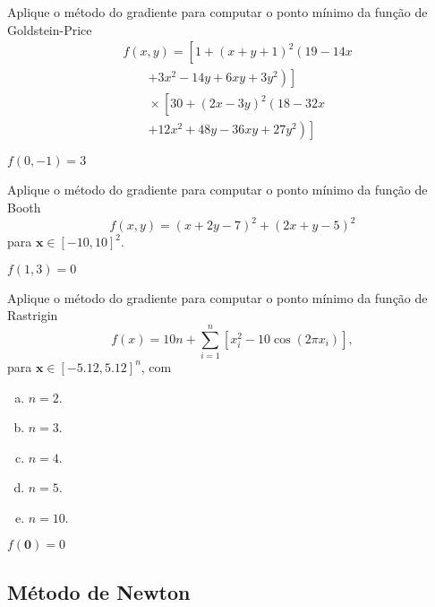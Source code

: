 \begin{exer}
  Aplique o método do gradiente para computar o ponto mínimo da função de Goldstein-Price \cite{Goldstein1971a}
  \begin{equation}
    \begin{aligned}
      & f(x,y) = \left[1+\left(x+y+1\right)^{2}\left(19-14x \right.\right.\\
      &\qquad \left.\left.+ 3x^{2}-14y+6xy+3y^{2}\right)\right] \\
      &\qquad \times \left[30+\left(2x-3y\right)^{2}\left(18-32x\right.\right.\\
      &\qquad \left.\left.+12x^{2}+48y-36xy+27y^{2}\right)\right]
    \end{aligned}  
  \end{equation}
\end{exer}
\begin{resp}
  $f(0,-1) = 3$
\end{resp}

\begin{exer}
  Aplique o método do gradiente para computar o ponto mínimo da função de Booth
  \begin{equation}
    f(x,y) = \left( x + 2y -7\right)^{2} + \left(2x +y - 5\right)^{2}
  \end{equation}
  para $\pmb{x}\in [-10, 10]^2$.
\end{exer}
\begin{resp}
  $f(1,3)=0$
\end{resp}

\begin{exer}
  Aplique o método do gradiente para computar o ponto mínimo da função de Rastrigin
  \begin{equation}
    f(x) = 10 n + \sum_{i=1}^n \left[x_i^2 - 10\cos(2 \pi x_i)\right],
  \end{equation}
  para $\pmb{x}\in[-5.12, 5.12]^n$, com
  \begin{enumerate}[a)]
    \item $n = 2$.
    \item $n = 3$.
    \item $n = 4$.
    \item $n = 5$.
    \item $n = 10$.
  \end{enumerate}
\end{exer}
\begin{resp}
$f(\pmb{0}) = 0$
\end{resp}


\subsection{Método de Newton}
\badgeRevisar

